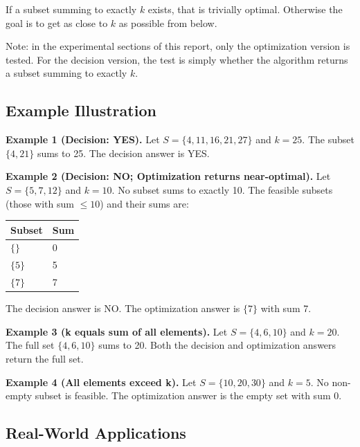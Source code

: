 \documentclass[12pt,a4paper]{article}
\theoremstyle{definition}
\begin{document}
If a subset summing to exactly $k$ exists, that is trivially optimal. Otherwise
the goal is to get as close to $k$ as possible from below.

Note: in the experimental sections of this report, only the optimization version
is tested. For the decision version, the test is simply whether the algorithm
returns a subset summing to exactly $k$.

\subsection{Example Illustration}

\textbf{Example 1 (Decision: YES).}
Let $S = \{4, 11, 16, 21, 27\}$ and $k = 25$. The subset $\{4, 21\}$ sums to
25. The decision answer is YES.

\textbf{Example 2 (Decision: NO; Optimization returns near-optimal).}
Let $S = \{5, 7, 12\}$ and $k = 10$. No subset sums to exactly 10.
The feasible subsets (those with sum $\leq 10$) and their sums are:

\begin{center}
  \begin{tabular}{ll}
    \toprule
    Subset & Sum \\
    \midrule
    $\{\}$   & 0 \\
    $\{5\}$  & 5 \\
    $\{7\}$  & 7 \\
    \bottomrule
  \end{tabular}
\end{center}

The decision answer is NO. The optimization answer is $\{7\}$ with sum 7.

\textbf{Example 3 (k equals sum of all elements).}
Let $S = \{4, 6, 10\}$ and $k = 20$. The full set $\{4, 6, 10\}$ sums to 20.
Both the decision and optimization answers return the full set.

\textbf{Example 4 (All elements exceed k).}
Let $S = \{10, 20, 30\}$ and $k = 5$. No non-empty subset is feasible.
The optimization answer is the empty set with sum 0.

\subsection{Real-World Applications}
\end{document}

